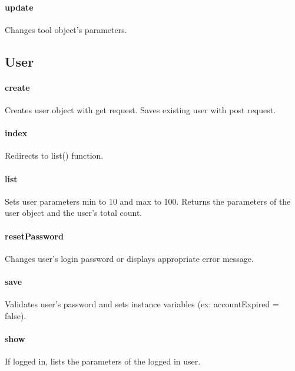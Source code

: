 \documentclass[12pt]{article}
\begin{document}
\paragraph{update} Changes tool object's parameters.

\subsection{User}\label{sec:CUser}
\paragraph{create} Creates user object with get request. Saves existing user with post request.
\paragraph{index} Redirects to list() function.
\paragraph{list} Sets user parameters min to 10 and max to 100. Returns the parameters of the user object and the user's total count.
\paragraph{resetPassword} Changes user's login password or displays appropriate error message.
\paragraph{save} Validates user's password and sets instance variables (ex: accountExpired = false).
\paragraph{show} If logged in, lists the parameters of the logged in user.
\end{document}
